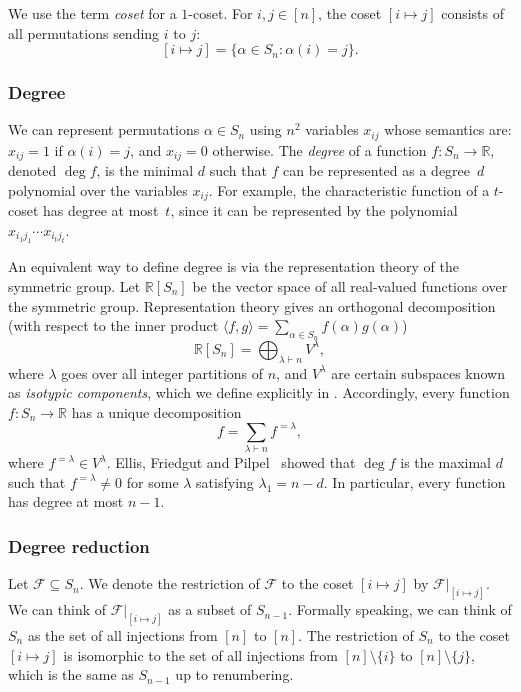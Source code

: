 \documentclass[10pt,a4paper]{article}
\theoremstyle{definition}
\providecommand{\coset}[2]{[#1 \mapsto #2]}
\begin{document}
We use the term \emph{coset} for a $1$-coset. For $i,j \in [n]$, the coset $\coset{i}{j}$ consists of all permutations sending $i$ to $j$:
\[
 \coset{i}{j} = \{ \alpha \in S_n : \alpha(i) = j \}.
\]

\subsubsection{Degree} \label{sec:degree-sym}

We can represent permutations $\alpha \in S_n$ using $n^2$ variables $x_{ij}$ whose semantics are: $x_{ij} = 1$ if $\alpha(i) = j$, and $x_{ij} = 0$ otherwise. The \emph{degree} of a function $f\colon S_n \to \mathbb{R}$, denoted $\deg f$, is the minimal $d$ such that $f$ can be represented as a degree~$d$ polynomial over the variables $x_{ij}$.
For example, the characteristic function of a $t$-coset has degree at most~$t$, since it can be represented by the polynomial $x_{i_1j_1} \cdots x_{i_tj_t}$.

An equivalent way to define degree is via the representation theory of the symmetric group. Let $\mathbb{R}[S_n]$ be the vector space of all real-valued functions over the symmetric group. Representation theory gives an orthogonal decomposition (with respect to the inner product $\langle f,g \rangle = \sum_{\alpha \in S_n} f(\alpha) g(\alpha)$)
\[
 \mathbb{R}[S_n] = \bigoplus_{\lambda \vdash n} V^\lambda,
\]
where $\lambda$ goes over all integer partitions of $n$, and $V^\lambda$ are certain subspaces known as \emph{isotypic components}, which we define explicitly in . Accordingly, every function $f\colon S_n \to \mathbb{R}$ has a unique decomposition
\[
 f = \sum_{\lambda \vdash n} f^{=\lambda},
\]
where $f^{=\lambda} \in V^\lambda$. 
Ellis, Friedgut and Pilpel~\cite[Theorem 7]{EFP} showed that $\deg f$ is the maximal $d$ such that $f^{=\lambda} \neq 0$ for some $\lambda$ satisfying $\lambda_1 = n - d$. In particular, every function has degree at most $n-1$.

\subsubsection{Degree reduction} \label{sec:degree-reduction-sym}

Let $\mathcal{F} \subseteq S_n$. We denote the restriction of $\mathcal{F}$ to the coset $\coset{i}{j}$ by $\mathcal{F}|_{\coset{i}{j}}$. We can think of $\mathcal{F}|_{\coset{i}{j}}$ as a subset of $S_{n-1}$. Formally speaking, we can think of $S_n$ as the set of all injections from $[n]$ to $[n]$. The restriction of $S_n$ to the coset $\coset{i}{j}$ is isomorphic to the set of all injections from $[n] \setminus \{i\}$ to $[n] \setminus \{j\}$, which is the same as $S_{n-1}$ up to renumbering.
\end{document}
